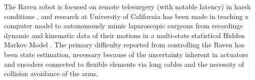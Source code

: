 The Raven robot is focused on remote telesurgery (with notable latency) in harsh conditions \citep{bib:docatadist}, and research at University of California has been made in teaching a computer model to autonomously mimic laparoscopic surgeons from recordings dynamic and kinematic data of their motions in a multi-state statistical Hidden Markov Model \citep{bib:economist}. 
The primary difficulty reported from controlling the Raven has been state estimation, necessary because of the uncertainty inherent in actuators and encoders connected to flexible elements via long cables \citep{bib:raven_debride} and the necessity of collision avoidance of the arms.

